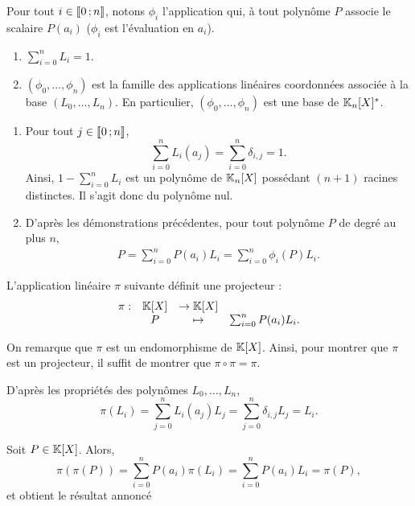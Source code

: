 \begin{prop}{}{}
Pour tout $i \in \llbracket 0\,; n \rrbracket$, notons $\phi_i$ l'application qui, à tout polynôme $P$ associe le scalaire $P(a_i)$ ($\phi_i$ est l'évaluation en $a_i$).
\begin{enumerate}
\item $\sum\limits_{i=0}^n L_i = 1$.

\item $(\phi_0,\ldots,\phi_n)$ est la famille des applications linéaires coordonnées associée à la base $(L_0,\ldots,L_n)$. En particulier, $(\phi_0,\ldots,\phi_n)$ est une base de $\mathbb{K}_n[X]^*$.
\end{enumerate}
\end{prop}

\begin{demo}
\begin{enumerate}
\item Pour tout $j \in \llbracket 0\,; n \rrbracket$,
\[
\sum_{i=0}^n L_i(a_j) = \sum_{i=0}^n \delta_{i,j} = 1.
\]
Ainsi, $1 - \sum_{i=0}^n L_i$ est un polynôme de $\mathbb{K}_n[X]$ possédant $(n + 1)$ racines distinctes. Il s'agit donc du polynôme nul.

\item D'après les démonstrations précédentes, pour tout polynôme $P$ de degré au plus $n$,
\begin{align*}
P
= \sum_{i=0}^n P(a_i) L_i
= \sum_{i=0}^n \phi_i(P) L_i.
\end{align*}
\end{enumerate}
\end{demo}

\begin{theo}
L'application linéaire $\pi$ suivante définit une projecteur :
\[
\begin{array}{lccc}
\pi : &\mathbb{K}[X]&\to\mathbb{K}[X]\\
&P&\mapsto&\sum_{i=0}^n P(a_i) L_i.
\end{array}
\]
\end{theo}

\begin{demo}
On remarque que $\pi$ est un endomorphisme de $\mathbb{K}[X]$. Ainsi, pour montrer que $\pi$ est un projecteur, il suffit de montrer que $\pi \circ \pi = \pi$.

D'après les propriétés des polynômes $L_0,\ldots,L_n$,
\[
\pi(L_i)
= \sum_{j=0}^n L_i(a_j) L_j
= \sum_{j=0}^n \delta_{i,j} L_j
= L_i.
\]

Soit $P \in \mathbb{K}[X]$. Alors,
\[
\pi(\pi(P))
= \sum_{i=0}^n P(a_i) \pi(L_i)
= \sum_{i=0}^n P(a_i) L_i
= \pi(P),
\]
et obtient le résultat annoncé
\end{demo}

